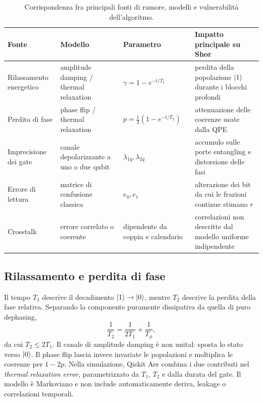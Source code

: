 \begin{onehalfspace}
\begin{table}[!htbp]
\centering
\small
\begin{tabular}{@{}p{2.5cm}p{3.2cm}p{2.8cm}p{4.0cm}@{}}
\toprule
\textbf{Fonte} & \textbf{Modello} & \textbf{Parametro} & \textbf{Impatto principale su Shor} \\
\midrule
Rilassamento energetico
& amplitude damping / thermal relaxation
& $\gamma=1-e^{-t/T_1}$
& perdita della popolazione $\ket{1}$ durante i blocchi profondi \\[2pt]
Perdita di fase
& phase flip / thermal relaxation
& $p=\tfrac12(1-e^{-t/T_2})$
& attenuazione delle coerenze usate dalla QPE \\[2pt]
Imprecisione dei gate
& canale depolarizzante a uno o due qubit
& $\lambda_{1q},\lambda_{2q}$
& accumulo sulle porte entangling e distorsione delle fasi \\[2pt]
Errore di lettura
& matrice di confusione classica
& $e_0,e_1$
& alterazione dei bit da cui le frazioni continue stimano $r$ \\[2pt]
Crosstalk
& errore correlato o coerente
& dipendente da coppia e calendario
& correlazioni non descritte dal modello uniforme indipendente \\
\bottomrule
\end{tabular}
\caption{Corrispondenza fra principali fonti di rumore, modelli e vulnerabilità dell'algoritmo.}
\label{tab:fonti_rumore}
\label{tab:mapping_rumore}
\label{tab:canali_rumore}
\end{table}

\subsection{Rilassamento e perdita di fase}

Il tempo $T_1$ descrive il decadimento $\ket{1}\rightarrow\ket{0}$, mentre $T_2$ descrive la perdita della fase relativa. Separando la componente puramente dissipativa da quella di puro dephasing,
\begin{equation}
    \frac{1}{T_2}=\frac{1}{2T_1}+\frac{1}{T_\phi},
    \label{eq:T2_decomp}
\end{equation}
da cui $T_2\leq2T_1$. Il canale di amplitude damping è non unital: sposta lo stato verso $\ket{0}$. Il phase flip lascia invece invariate le popolazioni e moltiplica le coerenze per $1-2p$. Nella simulazione, Qiskit Aer combina i due contributi nel \emph{thermal relaxation error}, parametrizzato da $T_1$, $T_2$ e dalla durata del gate. Il modello è Markoviano e non include automaticamente deriva, leakage o correlazioni temporali.


\end{onehalfspace}
